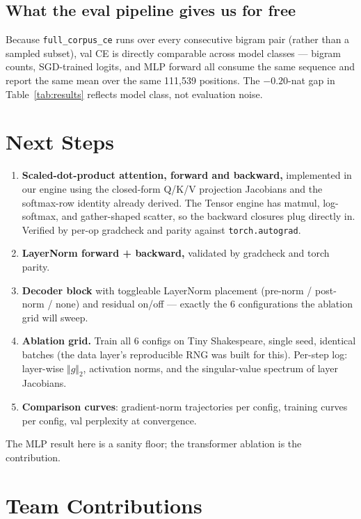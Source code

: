 \documentclass{article}
\begin{document}
\subsection{What the eval pipeline gives us for free} Because \texttt{full\_corpus\_ce} runs over every consecutive bigram pair (rather than a sampled subset), val CE is directly comparable across model classes — bigram counts, SGD-trained logits, and MLP forward all consume the same sequence and report the same mean over the same 111{,}539 positions. The $-0.20$-nat gap in Table~\ref{tab:results} reflects model class, not evaluation noise.

\section{Next Steps}

\begin{enumerate}
\setlength{\itemsep}{0pt}
  \item \textbf{Scaled-dot-product attention, forward and backward,} implemented in our engine using the closed-form Q/K/V projection Jacobians and the softmax-row identity already derived. The Tensor engine has matmul, log-softmax, and gather-shaped scatter, so the backward closures plug directly in. Verified by per-op gradcheck and parity against \texttt{torch.autograd}.
  \item \textbf{LayerNorm forward + backward,} validated by gradcheck and torch parity.
  \item \textbf{Decoder block} with toggleable LayerNorm placement (pre-norm / post-norm / none) and residual on/off — exactly the 6 configurations the ablation grid will sweep.
  \item \textbf{Ablation grid.} Train all 6 configs on Tiny Shakespeare, single seed, identical batches (the data layer's reproducible RNG was built for this). Per-step log: layer-wise $\Vert g \Vert_2$, activation norms, and the singular-value spectrum of layer Jacobians.
  \item \textbf{Comparison curves}: gradient-norm trajectories per config, training curves per config, val perplexity at convergence.
\end{enumerate}

\noindent The MLP result here is a sanity floor; the transformer ablation is the contribution.

\section{Team Contributions}
\end{document}
